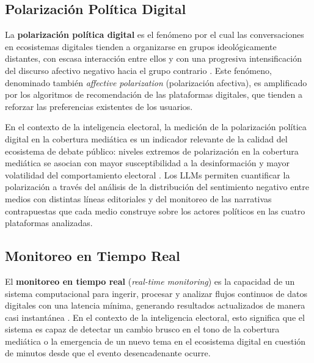 \subsection{Polarización Política Digital}

La \textbf{polarización política digital} es el fenómeno por el cual las conversaciones en ecosistemas digitales tienden a organizarse en grupos ideológicamente distantes, con escasa interacción entre ellos y con una progresiva intensificación del discurso afectivo negativo hacia el grupo contrario \parencite{mc_iyengar2019origins}. Este fenómeno, denominado también \textit{affective polarization} (polarización afectiva), es amplificado por los algoritmos de recomendación de las plataformas digitales, que tienden a reforzar las preferencias existentes de los usuarios.

En el contexto de la inteligencia electoral, la medición de la polarización política digital en la cobertura mediática es un indicador relevante de la calidad del ecosistema de debate público: niveles extremos de polarización en la cobertura mediática se asocian con mayor susceptibilidad a la desinformación y mayor volatilidad del comportamiento electoral \parencite{mc_iyengar2019origins}. Los LLMs permiten cuantificar la polarización a través del análisis de la distribución del sentimiento negativo entre medios con distintas líneas editoriales y del monitoreo de las narrativas contrapuestas que cada medio construye sobre los actores políticos en las cuatro plataformas analizadas.

\subsection{Monitoreo en Tiempo Real}

El \textbf{monitoreo en tiempo real} (\textit{real-time monitoring}) es la capacidad de un sistema computacional para ingerir, procesar y analizar flujos continuos de datos digitales con una latencia mínima, generando resultados actualizados de manera casi instantánea \parencite{mc_stonebraker2005streaming}. En el contexto de la inteligencia electoral, esto significa que el sistema es capaz de detectar un cambio brusco en el tono de la cobertura mediática o la emergencia de un nuevo tema en el ecosistema digital en cuestión de minutos desde que el evento desencadenante ocurre.

